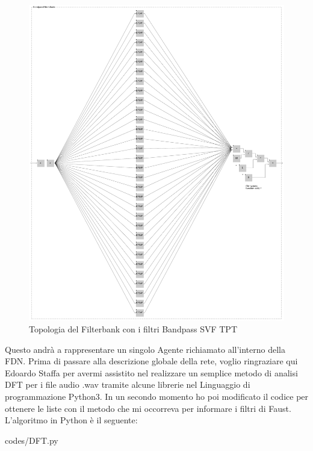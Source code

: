 \clearpage
\begin{figure}[h!]
\begin{center}
    \includegraphics[width=15cm]{figures/BPFilterBank.pdf}
    \caption{Topologia del Filterbank con i filtri Bandpass SVF TPT}
\end{center}
\vspace{0.5cm}
\end{figure}

Questo andrà a rappresentare un singolo Agente richiamato all'interno della FDN.
Prima di passare alla descrizione globale della rete,
voglio ringraziare qui Edoardo Staffa per avermi assistito 
nel realizzare un semplice metodo di analisi DFT per i file audio .wav 
tramite alcune librerie nel Linguaggio di programmazione Python3.
In un secondo momento ho poi modificato il codice per 
ottenere le liste con il metodo che mi occorreva per informare i filtri di Faust.
L'algoritmo in Python è il seguente:

\vspace{0.5cm} 

{codes/DFT.py}

